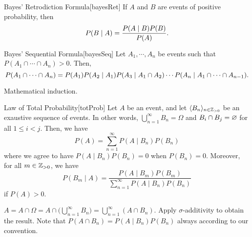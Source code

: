 \documentclass[../complex_variables_1.tex]{subfiles}
\begin{document}
\begin{Lemma}{Bayes' Retrodiction Formula}[bayesRet]
    If \(A\) and \(B\) are events of positive probability, then
    \[
        P(B \mid A) = \frac{P(A \mid B) P(B)}{P(A)}\text.
    \]
\end{Lemma}

\begin{Lemma}{Bayes' Sequential Formula}[bayesSeq]
    Let \(A_1, \cdots, A_n\) be events such that \(P(A_1 \cap \cdots \cap A_n) > 0\). Then,
    \[
        P(A_1 \cap \cdots \cap A_n) = P(A_1) P(A_2 \mid A_1) P(A_3 \mid A_1 \cap A_2) \cdots P(A_n
        \mid A_1 \cap \cdots \cap A_{n-1})\text.
    \]
\end{Lemma}
\begin{myproof}[Proof]
    Mathematical induction.
\end{myproof}

\begin{Lemma}{Law of Total Probability}[totProb]
    Let \(A\) be an event, and let \(\lang B_n \rang_{n \in \ZZ_{>0}}\) be an exaustive sequence of
    events. In other words, \(\bigcup_{n=1}^\infty B_n = \Omega\)
    and \(B_i \cap B_j = \varnothing\) for all \(1 \le i < j\). Then, we have
    \[
        P(A) = \sum_{n=1}^\infty P(A \mid B_n) P(B_n)
    \]
    where we agree to have \(P(A \mid B_n) P(B_n) = 0\) when \(P(B_n) = 0\).
    Moreover, for all \(m \in \ZZ_{>0}\), we have
    \[
        P(B_m \mid A) = \frac{P(A \mid B_m) P(B_m)}{\sum_{n=1}^\infty P(A \mid B_n) P(B_n)}
    \]
    if \(P(A) > 0\).
\end{Lemma}
\begin{myproof}[Proof]
    \(A = A \cap \Omega = A \cap \bigl( \bigcup_{n=1}^\infty B_n \bigr) = \bigcup_{n=1}^\infty (A
    \cap B_n)\). Apply \(\sigma\)-additivity to obtain the result.
    Note that \(P(A \cap B_n) = P(A \mid B_n) P(B_n)\) always according to our convention.
\end{myproof}
\end{document}
